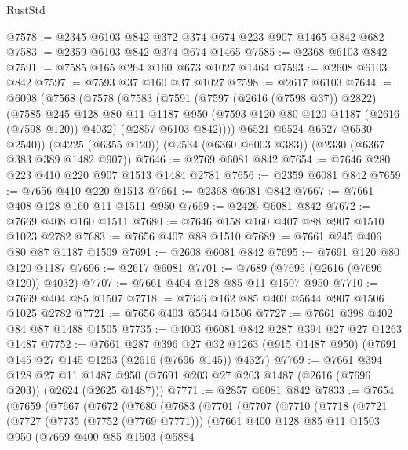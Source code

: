 \begin{lexlean}{RustStd}
\begin{coremodule}
@7578 := @2345 @6103 @842 @372 @374 @674 @223 @907 @1465 @842 @682
@7583 := @2359 @6103 @842 @374 @674 @1465
@7585 := @2368 @6103 @842
@7591 := @7585 @165 @264 @160 @673 @1027 @1464
@7593 := @2608 @6103 @842
@7597 := @7593 @37 @160 @37 @1027
@7598 := @2617 @6103
@7644 := @6098
    (@7568
      (@7578
        (@7583
          (@7591
            (@7597 (@2616 (@7598 @37)) @2822)
            (@7585
              @245
              @128
              @80
              @11
              @1187
              @950
              (@7593 @120 @80 @120 @1187 (@2616 (@7598 @120)) @4032)
              (@2857 @6103 @842))))
        @6521
        @6524
        @6527
        @6530
        @2540))
    (@4225 (@6355 @120))
    (@2534 (@6360 @6003 @383))
    (@2330 (@6367 @383 @389 @1482 @907))
@7646 := @2769 @6081 @842
@7654 := @7646 @280 @223 @410 @220 @907 @1513 @1484 @2781
@7656 := @2359 @6081 @842
@7659 := @7656 @410 @220 @1513
@7661 := @2368 @6081 @842
@7667 := @7661 @408 @128 @160 @11 @1511 @950
@7669 := @2426 @6081 @842
@7672 := @7669 @408 @160 @1511
@7680 := @7646 @158 @160 @407 @88 @907 @1510 @1023 @2782
@7683 := @7656 @407 @88 @1510
@7689 := @7661 @245 @406 @80 @87 @1187 @1509
@7691 := @2608 @6081 @842
@7695 := @7691 @120 @80 @120 @1187
@7696 := @2617 @6081
@7701 := @7689 (@7695 (@2616 (@7696 @120)) @4032)
@7707 := @7661 @404 @128 @85 @11 @1507 @950
@7710 := @7669 @404 @85 @1507
@7718 := @7646 @162 @85 @403 @5644 @907 @1506 @1025 @2782
@7721 := @7656 @403 @5644 @1506
@7727 := @7661 @398 @402 @84 @87 @1488 @1505
@7735 := @4003 @6081 @842 @287 @394 @27 @27 @1263 @1487
@7752 := @7661
    @287
    @396
    @27
    @32
    @1263
    (@915 @1487 @950)
    (@7691 @145 @27 @145 @1263 (@2616 (@7696 @145)) @4327)
@7769 := @7661
    @394
    @128
    @27
    @11
    @1487
    @950
    (@7691 @203 @27 @203 @1487 (@2616 (@7696 @203)) (@2624 (@2625 @1487)))
@7771 := @2857 @6081 @842
@7833 := @7654
    (@7659
      (@7667
        (@7672
          (@7680
            (@7683
              (@7701
                (@7707
                  (@7710
                    (@7718
                      (@7721
                        (@7727
                          (@7735 (@7752 (@7769 @7771)))
                          (@7661
                            @400
                            @128
                            @85
                            @11
                            @1503
                            @950
                            (@7669
                              @400
                              @85
                              @1503
                              (@5884

\end{coremodule}
\end{lexlean}
